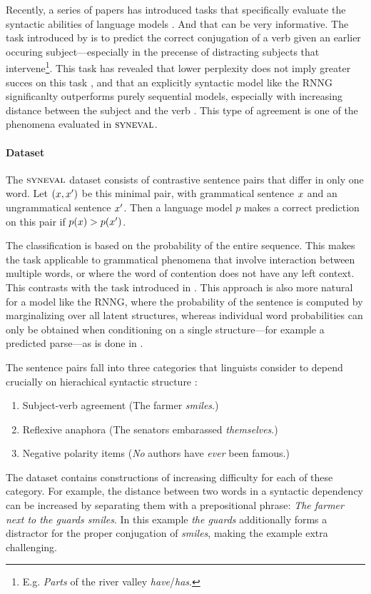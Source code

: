 Recently, a series of papers has introduced tasks that specifically evaluate the syntactic abilities of language models \citep{linzen2016syntax,gulordava2018colorless,linzen2018targeted}. And that can be very informative. The task introduced by \citet{linzen2016syntax} is to predict the correct conjugation of a verb given an earlier occuring subject---especially in the precense of distracting subjects that intervene\footnote{E.g. \textit{Parts} of the river valley \textit{have}/\textit{has}.}. This task has revealed that lower perplexity does not imply greater succes on this task \citep{tran2018recurrent}, and that an explicitly syntactic model like the RNNG significanlty outperforms purely sequential models, especially with increasing distance between the subject and the verb \citep{kuncoro2018learn}. This type of agreement is one of the phenomena evaluated in $\textsc{syneval}$.

\paragraph{Dataset}
The $\textsc{syneval}$ dataset consists of contrastive sentence pairs that differ in only one word. Let $(x, x')$ be this minimal pair, with grammatical sentence $x$ and an ungrammatical sentence $x'$. Then a language model $p$ makes a correct prediction on this pair if $p(x) > p(x')$.

The classification is based on the probability of the entire sequence. This makes the task applicable to grammatical phenomena that involve interaction between multiple words, or where the word of contention does not have any left context. This contrasts with the task introduced in \citet{linzen2016syntax}. This approach is also more natural for a model like the RNNG, where the probability of the sentence is computed by marginalizing over all latent structures, whereas individual word probabilities can only be obtained when conditioning on a single structure---for example a predicted parse---as is done in \cite{kuncoro2018learn}.

The sentence pairs fall into three categories that linguists consider to depend crucially on hierachical syntactic structure \citep{everaert2015structures,xiang2009illusory}:
  \begin{enumerate}[noitemsep]
    \item Subject-verb agreement (The farmer \textit{smiles}.)
    \item Reflexive anaphora (The senators embarassed \textit{themselves}.)
    \item Negative polarity items (\textit{No} authors have \textit{ever} been famous.)
  \end{enumerate}
The dataset contains constructions of increasing difficulty for each of these category. For example, the distance between two words in a syntactic dependency can be increased by separating them with a prepositional phrase: \textit{The farmer next to the guards smiles}. In this example \textit{the guards} additionally forms a distractor for the proper conjugation of \textit{smiles}, making the example extra challenging.

